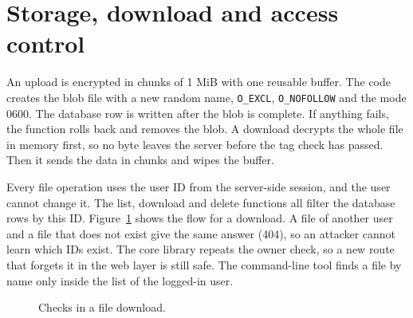 \section{Storage, download and access control}

An upload is encrypted in chunks of 1 MiB with one reusable buffer. The code creates the blob file with a new random name, \texttt{O\_EXCL}, \texttt{O\_NOFOLLOW} and the mode 0600. The database row is written after the blob is complete. If anything fails, the function rolls back and removes the blob. A download decrypts the whole file in memory first, so no byte leaves the server before the tag check has passed. Then it sends the data in chunks and wipes the buffer.

Every file operation uses the user ID from the server-side session, and the user cannot change it. The list, download and delete functions all filter the database rows by this ID. Figure~\ref{fig:access} shows the flow for a download. A file of another user and a file that does not exist give the same answer (404), so an attacker cannot learn which IDs exist. The core library repeats the owner check, so a new route that forgets it in the web layer is still safe. The command-line tool finds a file by name only inside the list of the logged-in user.

\begin{figure}[htb]
    \centering
    \caption{Checks in a file download.}
    \label{fig:access}
\end{figure}

